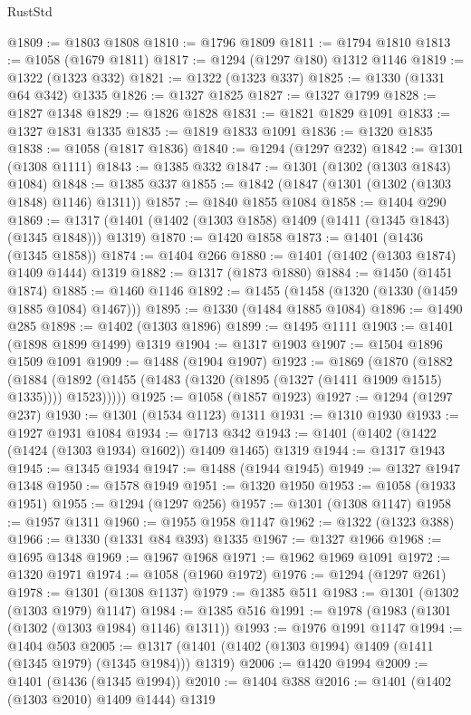 \begin{lexlean}{RustStd}
\begin{coremodule}
{\begin{coremodule}
{{{{{{{{{{{{{{{{{{{{{{{{{{{{{{{{{{{{{{@1809 := @1803 @1808
@1810 := @1796 @1809
@1811 := @1794 @1810
@1813 := @1058 (@1679 @1811)
@1817 := @1294 (@1297 @180) @1312 @1146
@1819 := @1322 (@1323 @332)
@1821 := @1322 (@1323 @337)
@1825 := @1330 (@1331 @64 @342) @1335
@1826 := @1327 @1825
@1827 := @1327 @1799
@1828 := @1827 @1348
@1829 := @1826 @1828
@1831 := @1821 @1829 @1091
@1833 := @1327 @1831 @1335
@1835 := @1819 @1833 @1091
@1836 := @1320 @1835
@1838 := @1058 (@1817 @1836)
@1840 := @1294 (@1297 @232)
@1842 := @1301 (@1308 @1111)
@1843 := @1385 @332
@1847 := @1301 (@1302 (@1303 @1843) @1084)
@1848 := @1385 @337
@1855 := @1842 (@1847 (@1301 (@1302 (@1303 @1848) @1146) @1311))
@1857 := @1840 @1855 @1084
@1858 := @1404 @290
@1869 := @1317 (@1401 (@1402 (@1303 @1858) @1409 (@1411 (@1345 @1843) (@1345 @1848))) @1319)
@1870 := @1420 @1858
@1873 := @1401 (@1436 (@1345 @1858))
@1874 := @1404 @266
@1880 := @1401 (@1402 (@1303 @1874) @1409 @1444) @1319
@1882 := @1317 (@1873 @1880)
@1884 := @1450 (@1451 @1874)
@1885 := @1460 @1146
@1892 := @1455 (@1458 (@1320 (@1330 (@1459 @1885 @1084) @1467)))
@1895 := @1330 (@1484 @1885 @1084)
@1896 := @1490 @285
@1898 := @1402 (@1303 @1896)
@1899 := @1495 @1111
@1903 := @1401 (@1898 @1899 @1499) @1319
@1904 := @1317 @1903
@1907 := @1504 @1896 @1509 @1091
@1909 := @1488 (@1904 @1907)
@1923 := @1869
    (@1870
      (@1882
        (@1884 (@1892 (@1455 (@1483 (@1320 (@1895 (@1327 (@1411 @1909 @1515) @1335)))) @1523)))))
@1925 := @1058 (@1857 @1923)
@1927 := @1294 (@1297 @237)
@1930 := @1301 (@1534 @1123) @1311
@1931 := @1310 @1930
@1933 := @1927 @1931 @1084
@1934 := @1713 @342
@1943 := @1401 (@1402 (@1422 (@1424 (@1303 @1934) @1602)) @1409 @1465) @1319
@1944 := @1317 @1943
@1945 := @1345 @1934
@1947 := @1488 (@1944 @1945)
@1949 := @1327 @1947 @1348
@1950 := @1578 @1949
@1951 := @1320 @1950
@1953 := @1058 (@1933 @1951)
@1955 := @1294 (@1297 @256)
@1957 := @1301 (@1308 @1147)
@1958 := @1957 @1311
@1960 := @1955 @1958 @1147
@1962 := @1322 (@1323 @388)
@1966 := @1330 (@1331 @84 @393) @1335
@1967 := @1327 @1966
@1968 := @1695 @1348
@1969 := @1967 @1968
@1971 := @1962 @1969 @1091
@1972 := @1320 @1971
@1974 := @1058 (@1960 @1972)
@1976 := @1294 (@1297 @261)
@1978 := @1301 (@1308 @1137)
@1979 := @1385 @511
@1983 := @1301 (@1302 (@1303 @1979) @1147)
@1984 := @1385 @516
@1991 := @1978 (@1983 (@1301 (@1302 (@1303 @1984) @1146) @1311))
@1993 := @1976 @1991 @1147
@1994 := @1404 @503
@2005 := @1317 (@1401 (@1402 (@1303 @1994) @1409 (@1411 (@1345 @1979) (@1345 @1984))) @1319)
@2006 := @1420 @1994
@2009 := @1401 (@1436 (@1345 @1994))
@2010 := @1404 @388
@2016 := @1401 (@1402 (@1303 @2010) @1409 @1444) @1319
}}}}}}}}}}}}}}}}}}}}}}}}}}}}}}}}}}}}}}
\end{coremodule}}
\end{coremodule}
\end{lexlean}
